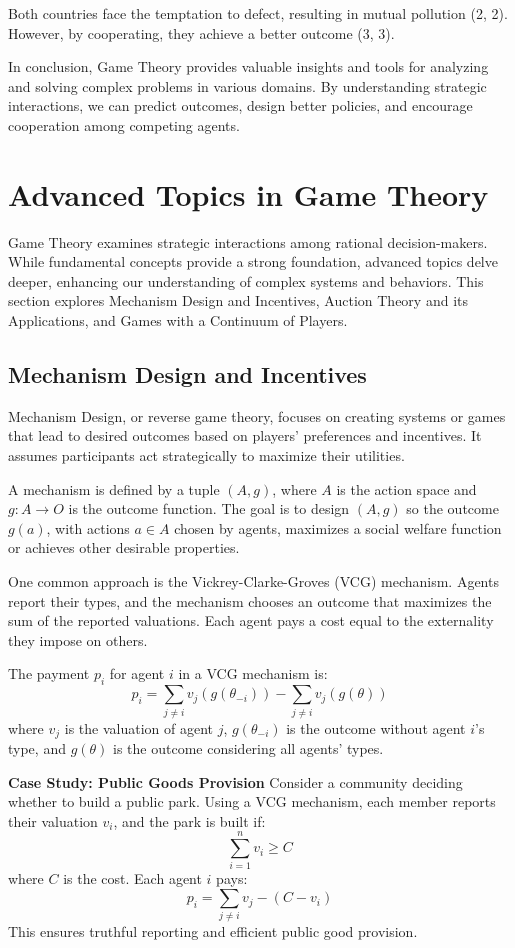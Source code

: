 \documentclass[12pt]{book} %
\begin{document}
Both countries face the temptation to defect, resulting in mutual pollution (2, 2). However, by cooperating, they achieve a better outcome (3, 3).

In conclusion, Game Theory provides valuable insights and tools for analyzing and solving complex problems in various domains. By understanding strategic interactions, we can predict outcomes, design better policies, and encourage cooperation among competing agents.


\section{Advanced Topics in Game Theory}
Game Theory examines strategic interactions among rational decision-makers. While fundamental concepts provide a strong foundation, advanced topics delve deeper, enhancing our understanding of complex systems and behaviors. This section explores Mechanism Design and Incentives, Auction Theory and its Applications, and Games with a Continuum of Players.

\subsection{Mechanism Design and Incentives}
Mechanism Design, or reverse game theory, focuses on creating systems or games that lead to desired outcomes based on players' preferences and incentives. It assumes participants act strategically to maximize their utilities.

A mechanism is defined by a tuple $(A, g)$, where $A$ is the action space and $g: A \to O$ is the outcome function. The goal is to design $(A, g)$ so the outcome $g(a)$, with actions $a \in A$ chosen by agents, maximizes a social welfare function or achieves other desirable properties.

One common approach is the Vickrey-Clarke-Groves (VCG) mechanism. Agents report their types, and the mechanism chooses an outcome that maximizes the sum of the reported valuations. Each agent pays a cost equal to the externality they impose on others.

The payment $p_i$ for agent $i$ in a VCG mechanism is:
\[
p_i = \sum_{j \neq i} v_j(g(\theta_{-i})) - \sum_{j \neq i} v_j(g(\theta))
\]
where $v_j$ is the valuation of agent $j$, $g(\theta_{-i})$ is the outcome without agent $i$'s type, and $g(\theta)$ is the outcome considering all agents' types.

\textbf{Case Study: Public Goods Provision}
Consider a community deciding whether to build a public park. Using a VCG mechanism, each member reports their valuation $v_i$, and the park is built if:
\[
\sum_{i=1}^n v_i \geq C
\]
where $C$ is the cost. Each agent $i$ pays:
\[
p_i = \sum_{j \neq i} v_j - (C - v_i)
\]
This ensures truthful reporting and efficient public good provision.
\end{document}
